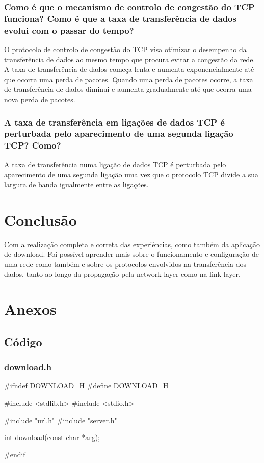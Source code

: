 \documentclass[11pt,a4paper]{article}
\begin{document}
\begin{multicols}{2}
\subsubsection{Como é que o mecanismo de controlo de congestão do TCP funciona? Como é que a taxa de transferência de dados evolui com o passar do tempo?}

O protocolo de controlo de congestão do TCP visa otimizar o desempenho da transferência de dados ao mesmo tempo que procura evitar a congestão da rede. A taxa de transferência de dados começa lenta e aumenta exponencialmente até que ocorra uma perda de pacotes. Quando uma perda de pacotes ocorre, a taxa de transferência de dados diminui e aumenta gradualmente até que ocorra uma nova perda de pacotes.

\subsubsection{A taxa de transferência em ligações de dados TCP é perturbada pelo aparecimento de uma segunda ligação TCP? Como?}

A taxa de transferência numa ligação de dados TCP é perturbada pelo aparecimento de uma segunda ligação uma vez que o protocolo TCP divide a sua largura de banda igualmente entre as ligações. 

\section{Conclusão}

Com a realização completa e correta das experiências, como também da aplicação de download. Foi possível aprender mais sobre o funcionamento e configuração de uma rede como também e sobre os protocolos envolvidos na transferência dos dados, tanto ao longo da propagação pela network layer como na link layer.

\end{multicols}

\section{Anexos}

\subsection{Código}

\subsubsection{download.h}
\begin{c-darktheme}
    #ifndef DOWNLOAD_H
    #define DOWNLOAD_H

    #include <stdlib.h>
    #include <stdio.h>

    #include "url.h"
    #include "server.h"

    int download(const char *arg);

    #endif
\end{c-darktheme}
\end{document}
